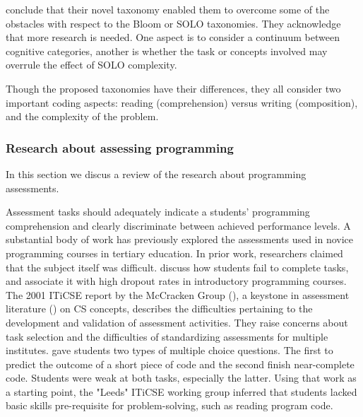  conclude that their novel taxonomy enabled them to overcome some of the obstacles with respect to the Bloom or SOLO taxonomies. They acknowledge that more research is needed. One aspect is to consider a continuum between cognitive categories, another is whether the task or concepts involved may overrule the effect of SOLO complexity.



Though the proposed taxonomies have their differences, they all consider two important coding aspects: reading (comprehension) versus writing (composition), and the complexity of the problem.




\subsubsection{Research about assessing programming}\label{sec:researchAssProgramming}
In this section we discus a review of the research about programming assessments.

Assessment tasks should adequately indicate a students’ programming comprehension and clearly discriminate between achieved performance levels.
A substantial body of work has previously explored the assessments used in novice programming courses in tertiary education. In prior work, researchers claimed that the subject itself was difficult.  discuss how students fail to complete tasks, and  associate it with high dropout rates in introductory programming courses. The 2001 ITiCSE report by the McCracken Group (\cite{McCracken2001}), a keystone in assessment literature (\cite{Giordano2015}) on CS concepts, describes the difficulties pertaining to the development and validation of assessment activities. They raise concerns about task selection and the difficulties of standardizing assessments for multiple institutes.   gave students two types of multiple choice questions. The first to predict the outcome of a short piece of code and the second finish near-complete code. Students were weak at both tasks, especially the latter. Using that work as a starting point, the "Leeds" ITiCSE working group inferred that students lacked basic skills pre-requisite for problem-solving, such as reading program code.


